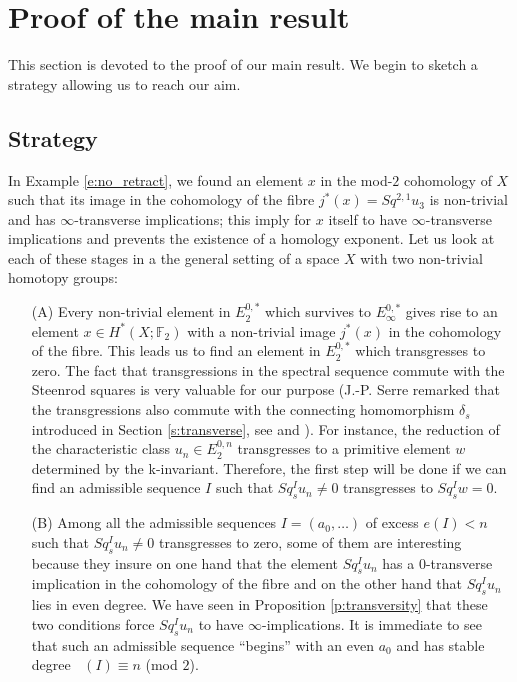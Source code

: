 \documentclass{amsart}
\theoremstyle{definition}
\theoremstyle{remark}
\DeclareMathOperator{\degst}{deg_{st}}
\newcommand{\F}{\mathbb{F}}
\begin{document}
\newpage
\section{Proof of the main result}\label{s:proofs}

This section is devoted to the proof of our main result. We begin to sketch a strategy allowing us to reach our aim.

\subsection*{Strategy}
In Example \ref{e:no_retract}, we found an element $x$ in the mod-$2$ cohomology of $X$ such that its image in the cohomology of the fibre $j^*(x)=Sq^{2,1}u_3$ is non-trivial and has $\infty$-transverse implications; this imply for $x$ itself to have $\infty$-transverse implications and prevents the existence of a homology exponent. Let us look at each of these stages in a the general setting of a space $X$ with two non-trivial homotopy groups:
\begin{itemize}
\item[(A)]{Every non-trivial element in $E_2^{0,*}$ which survives to $E_\infty^{0,*}$ gives rise to an element $x\in H^*(X;\F_2)$ with a non-trivial image $j^*(x)$ in the cohomology of the fibre. This leads us to find an element in $E_2^{0,*}$ which transgresses to zero. The fact that transgressions in the spectral sequence commute with the Steenrod squares is very valuable for our purpose (J.-P. Serre remarked that the transgressions also commute with the connecting homomorphism $\delta_s$ introduced in Section \ref{s:transverse}, see \cite[p. 206]{Se53} and \cite[p. 457]{Se51}). For instance, the reduction of the characteristic class $u_n\in E_2^{0,n}$ transgresses to a primitive element $w$ determined by the k-invariant. Therefore, the first step will be done if we can find an admissible sequence $I$ such that $Sq^I_s u_n\not=0$ transgresses to $Sq^I_s w=0$.}
\item[(B)]{Among all the admissible sequences $I=(a_0,\dots)$ of excess $e(I)<n$ such that $Sq^I_s u_n\not=0$ transgresses to zero, some of them are interesting because they insure on one hand that the element $Sq^I_s u_n$ has a $0$-transverse implication in the cohomology of the fibre and on the other hand that $Sq^I_s u_n$ lies in even degree. We have seen in Proposition \ref{p:transversity} that these two conditions force $Sq^I_s u_n$ to have $\infty$-implications. It is immediate to see that such an admissible sequence ``begins'' with an even $a_0$ and has stable degree $\degst(I)\equiv n$ (mod $2$).}
\end{itemize}
\end{document}
